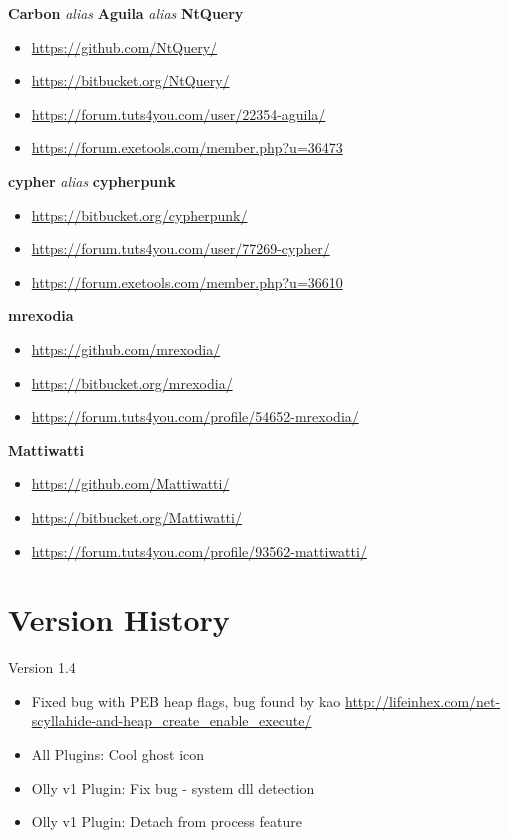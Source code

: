 \documentclass[10pt,a4paper]{article}
\begin{document}
\begin{center}
\textbf{Carbon} \textit{alias} \textbf{Aguila} \textit{alias} \textbf{NtQuery}
\begin{itemize}
\item \url{https://github.com/NtQuery/}
\item \url{https://bitbucket.org/NtQuery/}
\item \url{https://forum.tuts4you.com/user/22354-aguila/}
\item \url{https://forum.exetools.com/member.php?u=36473}
\end{itemize}


\textbf{cypher} \textit{alias} \textbf{cypherpunk}
\begin{itemize}
\item \url{https://bitbucket.org/cypherpunk/}
\item \url{https://forum.tuts4you.com/user/77269-cypher/}
\item \url{https://forum.exetools.com/member.php?u=36610}
\end{itemize}

\textbf{mrexodia}
\begin{itemize}
\item \url{https://github.com/mrexodia/}
\item \url{https://bitbucket.org/mrexodia/}
\item \url{https://forum.tuts4you.com/profile/54652-mrexodia/}
\end{itemize}

\textbf{Mattiwatti}
\begin{itemize}
\item \url{https://github.com/Mattiwatti/}
\item \url{https://bitbucket.org/Mattiwatti/}
\item \url{https://forum.tuts4you.com/profile/93562-mattiwatti/}
\end{itemize}
\end{center}

\section{Version History}

Version 1.4
\begin{itemize}
\item Fixed bug with PEB heap flags, bug found by kao \url{http://lifeinhex.com/net-scyllahide-and-heap_create_enable_execute/}
\item All Plugins: Cool ghost icon
\item Olly v1 Plugin: Fix bug - system dll detection
\item Olly v1 Plugin: Detach from process feature
\end{itemize}
\end{document}
